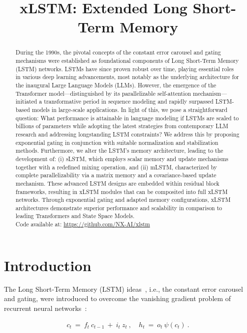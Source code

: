 \title{xLSTM: Extended Long Short-Term Memory}

\begin{abstract}
During the 1990s, the pivotal concepts of the constant error carousel and gating mechanisms were established as foundational components of Long Short-Term Memory (LSTM) networks. LSTMs have since proven robust over time, playing essential roles in various deep learning advancements, most notably as the underlying architecture for the inaugural Large Language Models (LLMs). However, the emergence of the Transformer model—distinguished by its parallelizable self-attention mechanism—initiated a transformative period in sequence modeling and rapidly surpassed LSTM-based models in large-scale applications. In light of this, we pose a straightforward question: What performance is attainable in language modeling if LSTMs are scaled to billions of parameters while adopting the latest strategies from contemporary LLM research and addressing longstanding LSTM constraints? We address this by proposing exponential gating in conjunction with suitable normalization and stabilization methods. Furthermore, we alter the LSTM's memory architecture, leading to the development of: (i) sLSTM, which employs scalar memory and update mechanisms together with a redefined mixing operation, and (ii) mLSTM, characterized by complete parallelizability via a matrix memory and a covariance-based update mechanism. These advanced LSTM designs are embedded within residual block frameworks, resulting in xLSTM modules that can be composited into full xLSTM networks. Through exponential gating and adapted memory configurations, xLSTM architectures demonstrate superior performance and scalability in comparison to leading Transformers and State Space Models.\\
Code available at: \url{https://github.com/NX-AI/xlstm}
\end{abstract}

\section{Introduction}
\label{sec:intro}

The Long Short-Term Memory (LSTM) ideas~\citep{Hochreiter:91,Hochreiter:97nips,Hochreiter:97}, i.e., the constant error carousel and gating, were introduced to overcome the vanishing gradient problem of recurrent neural networks~\citep{Hochreiter:91,Hochreiter:00book}:

\begin{align}
\label{eq:lstm_idea}
  c_t \ = \ f_t \ c_{t-1} \ + \ 
          i_t \  z_t \ , \quad  
          h_t \ = \ o_t \ \psi({c_t}) \ . 
\end{align}

